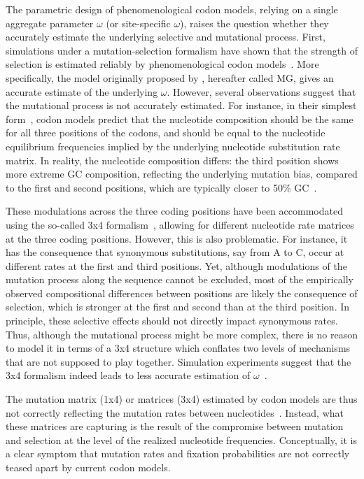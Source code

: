 \documentclass{article}
\begin{document}
The parametric design of phenomenological codon models, relying on a single aggregate parameter $\omega$ (or site-specific $\omega$), raises the question whether they accurately estimate the underlying selective and mutational process.
First, simulations under a mutation-selection formalism have shown that the strength of selection is estimated reliably by phenomenological codon models~\citep{Spielman2015}.
More specifically, the model originally proposed by \citet{Muse1994}, hereafter called MG, gives an accurate estimate of the underlying $\omega$.
However, several observations suggest that the mutational process is not accurately estimated.
For instance, in their simplest form~\citep{Muse1994, Goldman1994}, codon models predict that the nucleotide composition should be the same for all three positions of the codons, and should be equal to the nucleotide equilibrium frequencies implied by the underlying nucleotide {substitution} rate matrix.
In reality, the nucleotide composition differs: the third position shows more extreme GC composition, reflecting the underlying mutation bias, compared to the first and second positions, which are typically closer to 50\% GC~\citep{Singer2000}.

These modulations across the three coding positions have been accommodated using the so-called 3x4 formalism~\citep{Goldman1994, Pond2005a}, allowing for different nucleotide rate matrices at the three coding positions.
However, this is also problematic. For instance, it has the consequence that synonymous substitutions, say from A to C, occur at different rates at the first and third positions.
Yet, although modulations of the mutation process along the sequence cannot be excluded, most of the empirically observed compositional differences between positions are likely the consequence of selection, which is stronger at the first and second than at the third position.
In principle, these selective effects should not directly impact synonymous rates.
Thus, although the mutational process might be more complex, there is no reason to model it in terms of a 3x4 structure which conflates two levels of mechanisms that are not supposed to play together.
Simulation experiments suggest that the 3x4 formalism indeed leads to less accurate estimation of $\omega$~\citep{Spielman2015}.

The mutation matrix (1x4) or matrices (3x4) estimated by codon models are thus not correctly reflecting the mutation rates between nucleotides~\citep{Rodrigue2008a, KosakovskyPond2010}.
Instead, what these matrices are capturing is the result of the compromise between mutation and selection at the level of the realized nucleotide frequencies.
Conceptually, it is a clear symptom that mutation rates and fixation probabilities are not correctly teased apart by current codon models.
\end{document}
